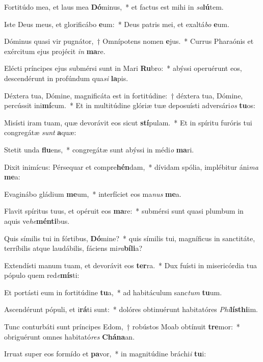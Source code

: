 \item Fortitúdo mea, et laus mea \textbf{Dó}minus,~* et factus est mihi in \textit{sa}\textbf{lú}tem.
\item Iste Deus meus, et glorificábo \textbf{e}um:~* Deus patris mei, et exaltá\textit{bo} \textbf{e}um.
\item Dóminus quasi vir pugnátor,~† Omnípotens nomen \textbf{e}jus.~* Currus Pharaónis et exércitum ejus projécit \textit{in} \textbf{ma}re.
\item Elécti príncipes ejus submérsi sunt in Mari \textbf{Ru}bro:~* abýssi operuérunt eos, descendérunt in profúndum qua\textit{si} \textbf{la}pis.
\item Déxtera tua, Dómine, magnificáta est in fortitúdine:~† déxtera tua, Dómine, percússit ini\textbf{mí}cum.~* Et in multitúdine glóriæ tuæ deposuísti adversári\textit{os} \textbf{tu}os:
\item Misísti iram tuam, quæ devorávit eos sicut \textbf{stí}pulam.~* Et in spíritu furóris tui congregátæ \textit{sunt} \textbf{a}quæ:
\item Stetit unda \textbf{flu}ens,~* congregátæ sunt abýssi in médi\textit{o} \textbf{ma}ri.
\item Dixit inimícus: Pérsequar et compre\textbf{hén}dam,~* dívidam spólia, implébitur áni\textit{ma} \textbf{me}a:
\item Evaginábo gládium \textbf{me}um,~* interfíciet eos ma\textit{nus} \textbf{me}a.
\item Flavit spíritus tuus, et opéruit eos \textbf{ma}re:~* submérsi sunt quasi plumbum in aquis ve\textit{he}\textbf{mén}\textbf{ti}bus.
\item Quis símilis tui in fórtibus, \textbf{Dó}mine?~* quis símilis tui, magníficus in sanctitáte, terríbilis atque laudábilis, fáciens mi\textit{ra}\textbf{bí}\textbf{li}a?
\item Extendísti manum tuam, et devorávit eos \textbf{ter}ra.~* Dux fuísti in misericórdia tua pópulo quem red\textit{e}\textbf{mís}ti:
\item Et portásti eum in fortitúdine \textbf{tu}a,~* ad habitáculum sanc\textit{tum} \textbf{tu}um.
\item Ascendérunt pópuli, et i\textbf{rá}ti sunt:~* dolóres obtinuérunt habitatóres \textit{Phi}\textbf{lís}\textbf{thi}im.
\item Tunc conturbáti sunt príncipes Edom,~† robústos Moab obtínuit \textbf{tre}mor:~* obriguérunt omnes habitató\textit{res} \textbf{Chá}\textbf{na}an.
\item Irruat super eos formído et \textbf{pa}vor,~* in magnitúdine bráchi\textit{i} \textbf{tu}i:
